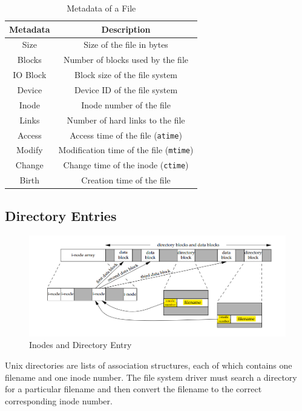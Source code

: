\begin{table}
\caption{Metadata of a File}
\begin{tabular}{ c c }
  \toprule
  Metadata & Description \\
 \midrule
  Size & Size of the file in bytes \\
  Blocks & Number of blocks used by the file \\
  IO Block & Block size of the file system \\
  Device & Device ID of the file system \\
  Inode & Inode number of the file \\
  Links & Number of hard links to the file \\
  Access & Access time of the file (\texttt{atime}) \\
  Modify & Modification time of the file (\texttt{mtime}) \\
  Change & Change time of the inode (\texttt{ctime}) \\
  Birth & Creation time of the file \\
 \bottomrule
 \end{tabular}
\end{table}


\subsection{Directory Entries}

\begin{figure}[ht]
  \includegraphics{images/png/inodes.png}
  \caption[Inode and Directory Entry]{Inodes and Directory Entry}
\end{figure}

Unix directories are lists of association structures, each of which contains one filename and one inode number.
The file system driver must search a directory for a particular filename and then convert the filename to the correct corresponding inode number.

